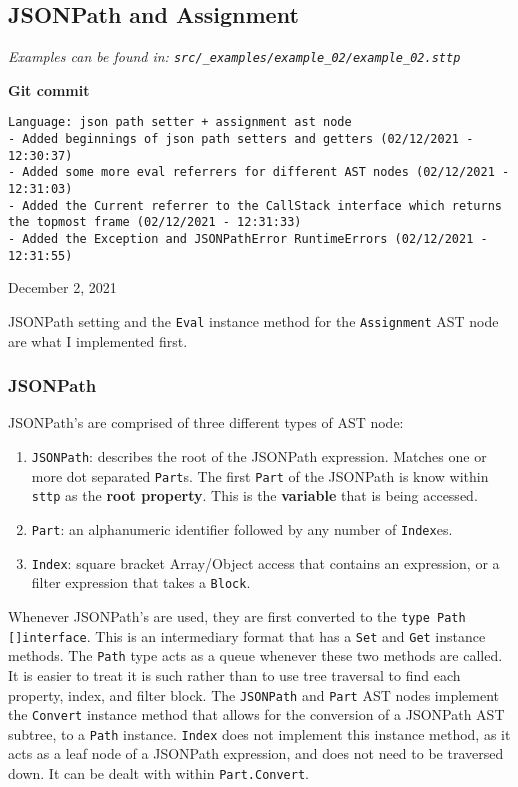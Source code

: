 \subsection{JSONPath and Assignment}

\cprotect\textit{Examples can be found in: \verb|src/_examples/example_02/example_02.sttp|}

\begin{center}
    \textbf{Git commit}
    \begin{verbatim}
Language: json path setter + assignment ast node
- Added beginnings of json path setters and getters (02/12/2021 - 12:30:37)
- Added some more eval referrers for different AST nodes (02/12/2021 - 12:31:03)
- Added the Current referrer to the CallStack interface which returns the topmost frame (02/12/2021 - 12:31:33)
- Added the Exception and JSONPathError RuntimeErrors (02/12/2021 - 12:31:55)
    \end{verbatim}
    \vspace{-1em}
    \tiny{December 2, 2021}
\end{center}

JSONPath setting and the \verb|Eval| instance method for the \verb|Assignment| AST node are what I implemented first.

\subsubsection{JSONPath}

JSONPath's are comprised of three different types of AST node:

\begin{enumerate}
    \item \verb|JSONPath|: describes the root of the JSONPath expression. Matches one or more dot separated \verb|Part|s. The first \verb|Part| of the JSONPath is know within \verb|sttp| as the \textbf{root property}. This is the \textbf{variable} that is being accessed.
    \item \verb|Part|: an alphanumeric identifier followed by any number of \verb|Index|es.
    \item \verb|Index|: square bracket Array/Object access that contains an expression, or a filter expression that takes a \verb|Block|.
\end{enumerate}

Whenever JSONPath's are used, they are first converted to the \texttt{type Path []interface{}}. This is an intermediary format that has a \verb|Set| and \verb|Get| instance methods. The \verb|Path| type acts as a queue whenever these two methods are called. It is easier to treat it is such rather than to use tree traversal to find each property, index, and filter block. The \verb|JSONPath| and \verb|Part| AST nodes implement the \verb|Convert| instance method that allows for the conversion of a JSONPath AST subtree, to a \verb|Path| instance. \verb|Index| does not implement this instance method, as it acts as a leaf node of a JSONPath expression, and does not need to be traversed down. It can be dealt with within \verb|Part.Convert|.

